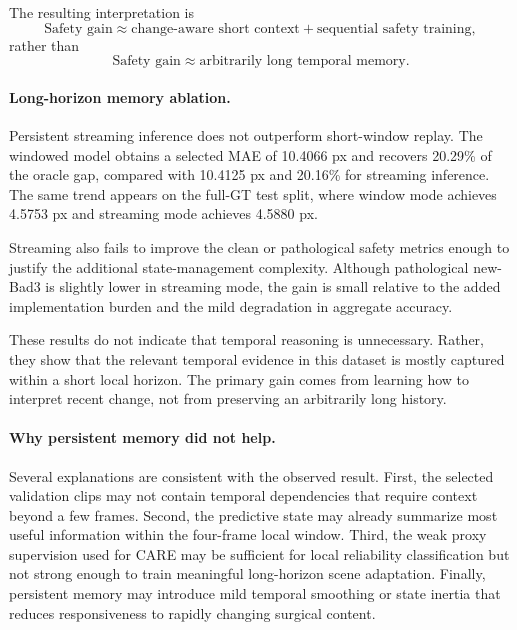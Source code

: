 \documentclass[11pt,a4paper]{article}
\begin{document}
The resulting interpretation is
\begin{equation}
    \text{Safety gain}
    \approx
    \text{change-aware short context}
    +
    \text{sequential safety training},
\end{equation}
rather than
\begin{equation}
    \text{Safety gain}
    \approx
    \text{arbitrarily long temporal memory}.
\end{equation}

\paragraph{Long-horizon memory ablation.}
Persistent streaming inference does not outperform short-window replay. The
windowed model obtains a selected MAE of 10.4066 px and recovers 20.29\% of the
oracle gap, compared with 10.4125 px and 20.16\% for streaming inference. The
same trend appears on the full-GT test split, where window mode achieves
4.5753 px and streaming mode achieves 4.5880 px.

Streaming also fails to improve the clean or pathological safety metrics enough
to justify the additional state-management complexity. Although pathological
new-Bad3 is slightly lower in streaming mode, the gain is small relative to the
added implementation burden and the mild degradation in aggregate accuracy.

These results do not indicate that temporal reasoning is unnecessary. Rather,
they show that the relevant temporal evidence in this dataset is mostly captured
within a short local horizon. The primary gain comes from learning how to
interpret recent change, not from preserving an arbitrarily long history.

\paragraph{Why persistent memory did not help.}
Several explanations are consistent with the observed result. First, the selected
validation clips may not contain temporal dependencies that require context
beyond a few frames. Second, the predictive state may already summarize most
useful information within the four-frame local window. Third, the weak proxy
supervision used for CARE may be sufficient for local reliability
classification but not strong enough to train meaningful long-horizon scene
adaptation. Finally, persistent memory may introduce mild temporal smoothing or
state inertia that reduces responsiveness to rapidly changing surgical content.
\end{document}
